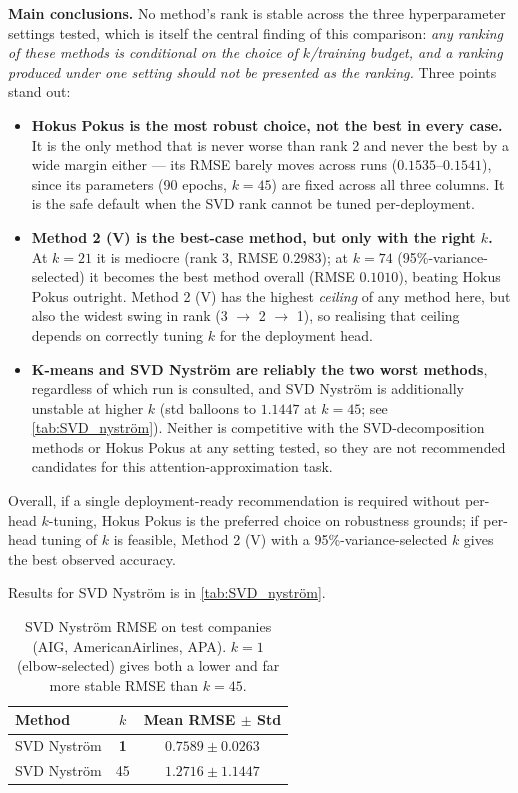 \noindent \textbf{Main conclusions.} No method's rank is stable across the three hyperparameter
settings tested, which is itself the central finding of this comparison: \emph{any ranking of
these methods is conditional on the choice of $k$/training budget, and a ranking produced under
one setting should not be presented as the ranking.} Three points stand out:
\begin{itemize}
  \item \textbf{Hokus Pokus is the most robust choice, not the best in every case.} It is the
    only method that is never worse than rank 2 and never the best by a wide margin either ---
    its RMSE barely moves across runs ($0.1535$--$0.1541$), since its parameters (90 epochs,
    $k=45$) are fixed across all three columns. It is the safe default when the SVD rank cannot
    be tuned per-deployment.
  \item \textbf{Method 2 (V) is the best-case method, but only with the right $k$.} At $k=21$
    it is mediocre (rank 3, RMSE $0.2983$); at $k=74$ (95\%-variance-selected) it becomes the best
    method overall (RMSE $0.1010$), beating Hokus Pokus outright. Method 2 (V) has the highest
    \emph{ceiling} of any method here, but also the widest swing in rank (3 $\to$ 2 $\to$ 1),
    so realising that ceiling depends on correctly tuning $k$ for the deployment head.
  \item \textbf{K-means and SVD Nyström are reliably the two worst methods}, regardless of which
    run is consulted, and SVD Nyström is additionally unstable at higher $k$ (std balloons to
    $1.1447$ at $k=45$; see \autoref{tab:SVD_nyström}). Neither is competitive with the
    SVD-decomposition methods or Hokus Pokus at any setting tested, so they are not recommended
    candidates for this attention-approximation task.
\end{itemize}
Overall, if a single deployment-ready recommendation is required without per-head $k$-tuning,
Hokus Pokus is the preferred choice on robustness grounds; if per-head tuning of $k$ is feasible,
Method 2 (V) with a 95\%-variance-selected $k$ gives the best observed accuracy.


\noindent Results for SVD Nyström is in \autoref{tab:SVD_nyström}.
\begin{table}[H]
\centering
\begin{tabular}{l c c}
\toprule
Method & $k$ & Mean RMSE $\pm$ Std \\
\midrule
SVD Nyström & \textbf{1} & $\mathbf{0.7589 \pm 0.0263}$ \\
SVD Nyström & 45 & $1.2716 \pm 1.1447$ \\
\bottomrule
\end{tabular}
\caption{SVD Nyström RMSE on test companies (AIG, AmericanAirlines, APA).
$k=1$ (elbow-selected) gives both a lower and far more stable RMSE than $k=45$.}
\label{tab:SVD_nyström}
\end{table}

